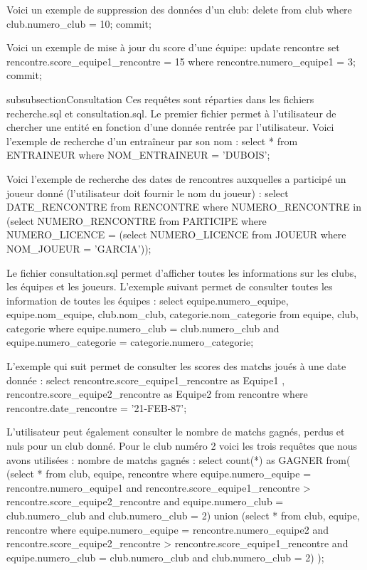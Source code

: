 Voici un exemple de suppression des données d'un club:
delete from club where club.numero_club = 10;
commit;

Voici un exemple de mise à jour du score d'une équipe:
update rencontre set rencontre.score_equipe1_rencontre = 15 where rencontre.numero_equipe1 = 3;
commit;

subsubsection{Consultation}
Ces requêtes sont réparties dans les fichiers recherche.sql et consultation.sql. Le premier fichier permet à l'utilisateur de chercher une entité en fonction d'une donnée rentrée par l'utilisateur.
Voici l'exemple de recherche d'un entraîneur par son nom :
select * from ENTRAINEUR where NOM_ENTRAINEUR = 'DUBOIS';

Voici l'exemple de recherche des dates de rencontres auxquelles a participé un joueur donné (l'utilisateur doit fournir le nom du joueur) :
select DATE_RENCONTRE from RENCONTRE where NUMERO_RENCONTRE in (select NUMERO_RENCONTRE from PARTICIPE where NUMERO_LICENCE = (select NUMERO_LICENCE from JOUEUR where NOM_JOUEUR = 'GARCIA'));

Le fichier consultation.sql permet d'afficher toutes les informations sur les clubs, les équipes et les joueurs. 
L'exemple suivant permet de consulter toutes les information de toutes les équipes :
select equipe.numero_equipe, equipe.nom_equipe, club.nom_club, categorie.nom_categorie
from equipe, club, categorie
where equipe.numero_club = club.numero_club and equipe.numero_categorie = categorie.numero_categorie;

L'exemple qui suit permet de consulter les scores des matchs joués à une date donnée :
select rencontre.score_equipe1_rencontre as Equipe1 , rencontre.score_equipe2_rencontre as Equipe2
from rencontre
where rencontre.date_rencontre = '21-FEB-87'; 

L'utilisateur peut également consulter le nombre de matchs gagnés, perdus et nuls pour un club donné.
Pour le club numéro 2 voici les trois requêtes que nous avons utilisées :
nombre de matchs gagnés :
select count(*) as GAGNER
from(
(select *
from club, equipe, rencontre
where equipe.numero_equipe = rencontre.numero_equipe1 
      and rencontre.score_equipe1_rencontre > rencontre.score_equipe2_rencontre
      and equipe.numero_club = club.numero_club
      and club.numero_club = 2)
union
(select *
from club, equipe, rencontre 
where equipe.numero_equipe = rencontre.numero_equipe2
      and rencontre.score_equipe2_rencontre > rencontre.score_equipe1_rencontre
      and equipe.numero_club = club.numero_club
      and club.numero_club = 2)
);

